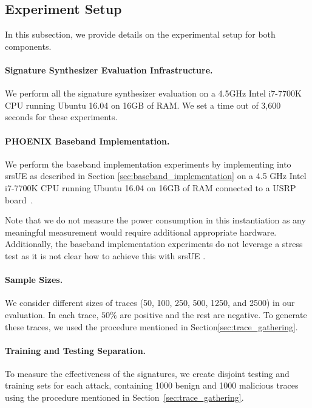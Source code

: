 \subsection{Experiment Setup}
In this subsection, we provide details on the experimental setup for both components.

\paragraph{Signature Synthesizer Evaluation Infrastructure.} We perform all the signature synthesizer evaluation on a 4.5GHz
Intel i7-7700K CPU running Ubuntu 16.04 on 16GB of RAM. We set a time out
of 3,600 seconds for these experiments.

\paragraph{PHOENIX Baseband Implementation.} We perform the baseband
implementation experiments by implementing \system into srsUE as described in
Section \ref{sec:baseband_implementation} on a 4.5 GHz Intel i7-7700K CPU
running Ubuntu 16.04 on 16GB of RAM
connected to a USRP board~\cite{usrp}.

Note that we do not measure the power consumption in this instantiation as any
meaningful measurement would require additional appropriate hardware. Additionally, the baseband implementation experiments do not leverage a stress test
as it is not clear how to achieve this with srsUE \cite{gomez2016srslte}.

\paragraph{Sample Sizes.} We consider different sizes of traces (50, 100, 250, 500, 1250, and 2500) in our evaluation. In each trace, $50\%$ are positive
and the rest are negative. To generate these traces, we used
the procedure mentioned in Section\ref{sec:trace_gathering}.

\paragraph{Training and Testing Separation.} To measure the effectiveness of the  signatures,
we create disjoint testing and training sets for each attack, containing
1000 benign and 1000 malicious traces using the procedure mentioned in Section~\ref{sec:trace_gathering}.


